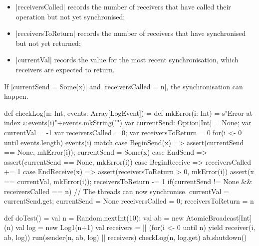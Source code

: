 \begin{answerS}
\begin{itemize}
\item |receiversCalled| records the number of receivers that have called their
  operation but not yet synchronised;

\item |receiversToReturn| records the number of receivers that have
  synchronised but not yet returned;

\item |currentVal| records the value for the most recent synchronisation,
  which receivers are expected to return.
\end{itemize}
%
If |currentSend = Some(x)| and |receiversCalled = n|, the synchronisation can
happen.  
%
\begin{scala}
  def checkLog(n: Int, events: Array[LogEvent]) = {
    def mkError(i: Int) = 
      s"Error at index $i: ${events(i)}\n"+events.mkString("\n")
    var currentSend: Option[Int] = None; var currentVal = -1
    var receiversCalled = 0; var receiversToReturn = 0
    for(i <- 0 until events.length){
      events(i) match{
        case BeginSend(x) => 
          assert(currentSend == None, mkError(i)); currentSend = Some(x)
        case EndSend => assert(currentSend == None, mkError(i))
        case BeginReceive => receiversCalled += 1
        case EndReceive(x) => 
          assert(receiversToReturn > 0, mkError(i))
          assert(x == currentVal, mkError(i)); receiversToReturn -= 1
      }
      if(currentSend != None && receiversCalled == n){
        // The threads can now synchronise.
        currentVal = currentSend.get; currentSend = None
        receiversCalled = 0; receiversToReturn = n
      }
    }
  }

  def doTest() = {
    val n = Random.nextInt(10); val ab = new AtomicBroadcast[Int](n)
    val log = new Log1(n+1)
    val receivers = || (for(i <- 0 until n) yield receiver(i, ab, log))
    run(sender(n, ab, log) || receivers)
    checkLog(n, log.get)
    ab.shutdown()
  }
\end{scala}
\end{answerS}
